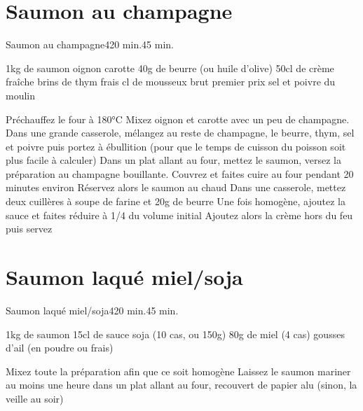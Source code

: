 {\section{Saumon au champagne}
\begin{recette}{Saumon au champagne}{4}{20 min.}{45 min.}
\begin{ingredients}
\ingredient 1kg de saumon
 oignon
 carotte
\ingredient 40g de beurre (ou huile d'olive)
\ingredient 50cl de crème fraîche
 brins de thym frais
 cl de mousseux brut premier prix
\ingredient sel et poivre du moulin 
\end{ingredients}

\begin{preparation}
\etape Préchauffez le four à 180°C
\etape Mixez oignon et carotte avec un peu de champagne.
\etape Dans une grande casserole, mélangez au reste de champagne, le beurre, thym, sel et poivre puis portez à ébullition (pour que le temps de cuisson du poisson soit plus facile à calculer)
\etape Dans un plat allant au four, mettez le saumon, versez la préparation au champagne bouillante. 
\etape Couvrez et faites cuire au four pendant 20 minutes environ
\etape Réservez alors le saumon au chaud
\etape Dans une casserole, mettez deux cuillères à soupe de farine et 20g de beurre
\etape Une fois homogène, ajoutez la sauce et faites réduire à 1/4 du volume initial
\etape Ajoutez alors la crème hors du feu puis servez
\end{preparation}
\end{recette}

\section{Saumon laqué miel/soja}
\begin{recette}{Saumon laqué miel/soja}{4}{20 min.}{45 min.}
\begin{ingredients}
\ingredient 1kg de saumon
\ingredient 15cl de sauce soja (10 cas, ou 150g)
\ingredient 80g de miel (4 cas)
 gousses d'ail (en poudre ou frais)
\end{ingredients}

\begin{preparation}
\etape Mixez toute la préparation afin que ce soit homogène
\etape Laissez le saumon mariner au moins une heure dans un plat allant au four, recouvert de papier alu (sinon, la veille au soir)
\end{preparation}


\end{recette}}
